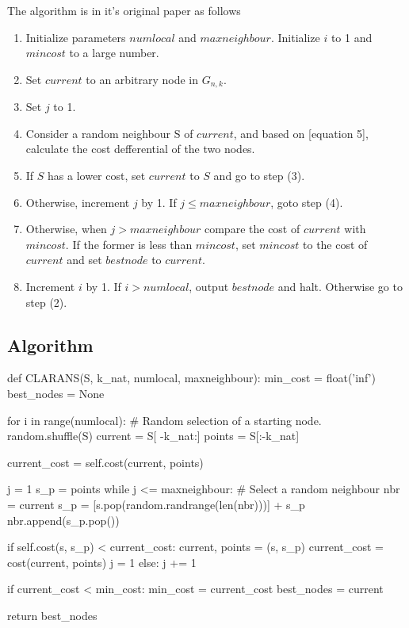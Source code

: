 The algorithm is in it's original paper as follows
\begin{enumerate}
    \item Initialize parameters $numlocal$ and $maxneighbour$.
          Initialize $i$ to 1 and $mincost$ to a large number.
    \item Set $current$ to an arbitrary node in $ G_{n,k} $.
    \item Set $j$ to 1.
    \item Consider a random neighbour S of $current$, and based on
          [equation 5], calculate the cost defferential of the two nodes.
    \item If $S$ has a lower cost, set $current$ to $S$
          and go to step (3).
    \item Otherwise, increment $j$ by 1. If $j \leq maxneighbour$, goto
          step (4).
    \item Otherwise, when $j > maxneighbour$ compare the cost of 
          $current$ with $mincost$. If the former is less than $mincost$,
          set $mincost$ to the cost of $current$ and set $bestnode$
          to $current$.
    \item Increment $i$ by 1. If $i > numlocal$, output $bestnode$ and halt.
          Otherwise go to step (2).
\end{enumerate}

\newpage

\subsection{Algorithm}

\begin{python}
def CLARANS(S, k_nat, numlocal, maxneighbour):
    min_cost    = float('inf')
    best_nodes  = None
    
    for i in range(numlocal):
        # Random selection of a starting node.
        random.shuffle(S)
        current = S[ -k_nat:]
        points  = S[:-k_nat]
        
        current_cost = self.cost(current, points)
        
        j = 1
        s_p = points
        while j <= maxneighbour:
            # Select a random neighbour
            nbr = current
            s_p = [s.pop(random.randrange(len(nbr)))] + s_p
            nbr.append(s_p.pop())
            
            if self.cost(s, s_p) < current_cost:
                current, points = (s, s_p)
                current_cost = cost(current, points)
                j = 1 
            else: 
                j += 1
        
        if current_cost < min_cost:
            min_cost    = current_cost
            best_nodes  = current
            
    return best_nodes
\end{python}

